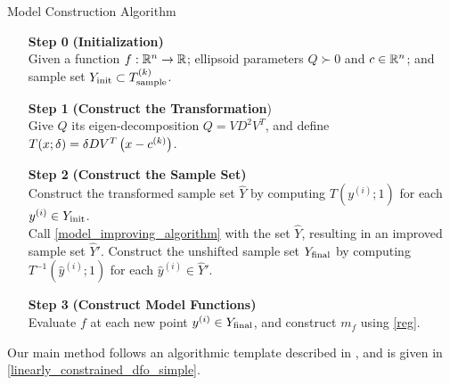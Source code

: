 \documentclass{article}
\begin{document}
{
\begin{fullwidth}[leftmargin=0in, rightmargin=0in, width=\linewidth-0.5in]
\begin{flushleft}

\begin{algorithm}[H]
    \caption{Model Construction Algorithm}
    \label{model_construction_algorithm}
    \begin{itemize}
        \item[\textbf{Step 0}] \textbf{(Initialization)} \\
			Given a function $f : \mathbb R^n \to \mathbb R$;
			ellipsoid parameters $Q \succ 0$ and $c \in \mathbb R^n$;
        	and sample set $Y_{\textrm{init}} \subset {T_{\text{sample}}^{(k)}}$.  
        \item[\textbf{Step 1}] \textbf{(Construct the Transformation}) \\
        	Give $Q$ its eigen-decomposition $Q = VD^2V^T$, and define
			$T(x; \delta) =  \delta D V^T\left(x - c^{(k)}\right)$.

        \item[\textbf{Step 2}] \textbf{(Construct the Sample Set)} \\
        Construct the transformed sample set $\hat Y$ by computing $T\left(y^{(i)}; 1\right)$ for each $y^{(i)} \in Y_{\textrm{init}}$. \\
        Call \cref{model_improving_algorithm} with the set $\hat{Y}$,  resulting in an improved sample set $\hat{Y}'$.
        Construct the unshifted sample set $Y_{\textrm{final}}$ by computing $T^{-1}\left(\hat y^{(i)}; 1 \right)$ for each $\hat y^{(i)} \in \hat Y'$.
        \item[\textbf{Step 3}] \textbf{(Construct Model Functions)} \\
        Evaluate $f$ at each new point $y^{(i)} \in Y_{\textrm{final}}$, and construct $m_f$ using \cref{reg}.
    \end{itemize}
\end{algorithm}


\end{flushleft}
\end{fullwidth}
}





Our main method follows
an algorithmic template described in \cite{Conejo:2013:GCT:2620806.2621814}, and is given in \cref{linearly_constrained_dfo_simple}.  
\end{document}
